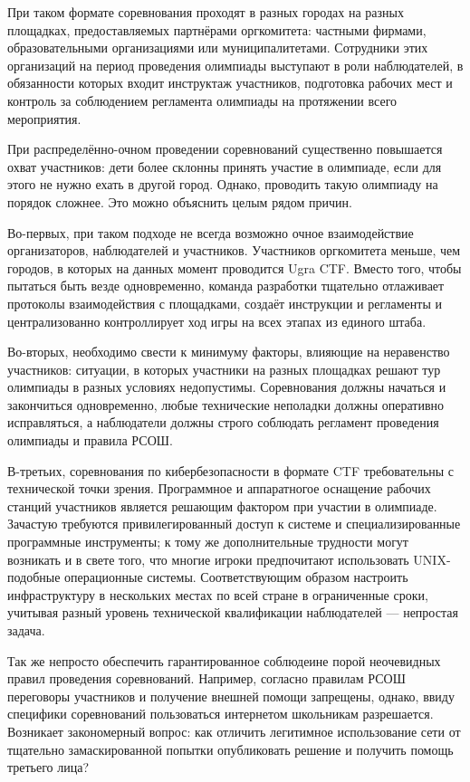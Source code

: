 При таком формате соревнования проходят в разных городах на разных площадках, предоставляемых партнёрами оргкомитета: частными фирмами, образовательными организациями или муниципалитетами.
Сотрудники этих организаций на период проведения олимпиады выступают в роли наблюдателей, в обязанности которых входит инструктаж участников, подготовка рабочих мест и контроль за соблюдением регламента олимпиады на протяжении всего мероприятия.

При распределённо-очном проведении соревнований существенно повышается охват участников: дети более склонны принять участие в олимпиаде, если для этого не нужно ехать в другой город. Однако, проводить такую олимпиаду на порядок сложнее. Это можно объяснить целым рядом причин.

Во-первых, при таком подходе не всегда возможно очное взаимодействие организаторов, наблюдателей и участников. Участников оргкомитета меньше, чем городов, в которых на данных момент проводится Ugra CTF. Вместо того, чтобы пытаться быть везде одновременно, команда разработки тщательно отлаживает протоколы взаимодействия с площадками, создаёт инструкции и регламенты и централизованно контроллирует ход игры на всех этапах из единого штаба.

Во-вторых, необходимо свести к минимуму факторы, влияющие на неравенство участников: ситуации, в которых участники на разных площадках решают тур олимпиады в разных условиях недопустимы. Соревнования должны начаться и закончиться одновременно, любые технические неполадки должны оперативно исправляться, а наблюдатели должны строго соблюдать регламент проведения олимпиады и правила РСОШ.

В-третьих, соревнования по кибербезопасности в формате CTF требовательны с технической точки зрения. Программное и аппаратногое оснащение рабочих станций участников является решающим фактором при участии в олимпиаде. Зачастую требуются привилегированный доступ к системе и специализированные программные инструменты; к тому же дополнительные трудности могут возникать и в свете того, что многие игроки предпочитают использовать UNIX-подобные операционные системы. Соответствующим образом настроить инфраструктуру в нескольких местах по всей стране в ограниченные сроки, учитывая разный уровень технической квалификации наблюдателей — непростая задача.

Так же непросто обеспечить гарантированное соблюдеине порой неочевидных правил проведения соревнований. Например, согласно правилам РСОШ переговоры участников и получение внешней помощи запрещены, однако, ввиду специфики соревнований пользоваться интернетом школьникам разрешается. Возникает закономерный вопрос: как отличить легитимное использование сети от тщательно замаскированной попытки опубликовать решение и получить помощь третьего лица?


